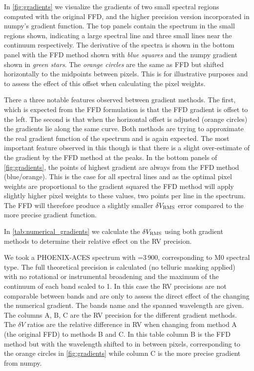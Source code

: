 

In \cref{fig:gradients} we visualize the gradients of two small spectral regions computed with the original {FFD}, and the higher precision version incorporated in numpy's gradient function.
The top panels contain the spectrum in the small regions shown, indicating a large spectral line and three small lines near the continuum respectively.
The derivative of the spectra is shown in the bottom panel with the {FFD} method shown with \emph{blue squares} and the numpy gradient shown in \emph{green stars}.
The \emph{orange circles} are the same as {FFD} but shifted horizontally to the midpoints between  pixels.
This is for illustrative purposes and to assess the effect of this offset when calculating the pixel weights.

There a three notable features observed between gradient methods.
The first, which is expected from the {FFD} formulation is that the {FFD} gradient is offset to the left.
The second is that when the horizontal offset is adjusted (orange circles) the gradients lie along the same curve.
Both methods are trying to approximate the real gradient function of the spectrum and is again expected.
The most important feature observed in this though is that there is a slight over-estimate of the gradient by the {FFD} method at the peaks.
In the bottom panels of \cref{fig:gradients}, the points of highest gradient are always from the {FFD} method (blue/orange).
This is the case for all spectral lines and as the optimal pixel weights are proportional to the gradient squared the {FFD} method will apply slightly higher pixel weights to these values, two points per line in the spectrum.
The {FFD} will therefore produce a slightly smaller \(\delta V_{\textrm{RMS}}\) error compared to the more precise gradient function.

In \cref{tab:numerical_gradients} we calculate the  \(\delta V_{\textrm{RMS}}\) using both gradient methods to determine their relative effect on the {RV} precision.

We took a {PHOENIX-ACES} spectrum with \txteff{}=3\,900\K{}, corresponding to {{M0}} spectral type.
The full theoretical precision is calculated (no telluric masking applied) with no rotational or instrumental broadening and the maximum of the continuum of each band scaled to 1.
In this case the {RV} precisions are not comparable between bands and are only to assess the direct effect of the changing the numerical gradient.
The bands name and the spanned wavelength are given.
The columns A, B, C are the {RV} precision for the different gradient methods.
The \(\delta V\) ratios are the relative difference in {RV} when changing from method A (the original {FFD}) to methods B and C.
In this table column B is the {FFD} method but with the wavelength shifted to in between pixels, corresponding to the orange circles in \cref{fig:gradients} while column C is the more precise gradient from numpy.

